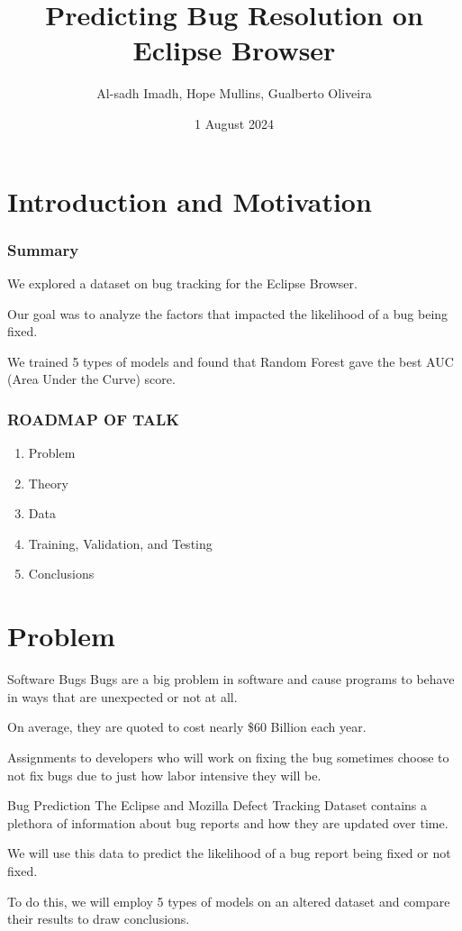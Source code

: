 \documentclass[notes,compress,serif,professionalfont]{beamer}
\begin{document}
\title{Predicting Bug Resolution on Eclipse Browser}
\author{Al-sadh Imadh, Hope Mullins, Gualberto Oliveira}
\date{1 August 2024}

\begin{frame}
  \titlepage
\end{frame}


\section{Introduction and Motivation}
\begin{frame}
\frametitle{Summary}
   We explored a dataset on bug tracking for the Eclipse Browser. \pause

\bigskip
   Our goal was to analyze the factors that impacted the likelihood of a bug being fixed. \pause

\bigskip
    We trained 5 types of models and found that Random Forest gave the best AUC (Area Under the Curve) score.
    
\end{frame}

\begin{frame}
\frametitle{ROADMAP OF TALK}
  \begin{enumerate}[<+->]
  \item Problem
  \item Theory
  \item Data
  \item Training, Validation, and Testing
  \item Conclusions
  \end{enumerate}
\end{frame}

\section{Problem}
\begin{frame}{Software Bugs}
         Bugs are a big problem in software and cause programs to behave in ways that are unexpected or not at all. \pause 

        \bigskip
        On average, they are quoted to cost nearly \$60 Billion each year. \pause

        \bigskip
        Assignments to developers who will work on fixing the bug sometimes choose to not fix bugs due to just how labor intensive they will be.
\end{frame}

\begin{frame}{Bug Prediction}
         The Eclipse and Mozilla Defect Tracking Dataset contains a plethora of information about bug reports and how they are updated over time. \cite{LamkanfiMSR13}\pause
         
        \bigskip
        We will use this data to predict the likelihood of a bug report being fixed or not fixed. \pause

        \bigskip
        To do this, we will employ 5 types of models on an altered dataset and compare their results to draw conclusions.
\end{frame}
\end{document}
